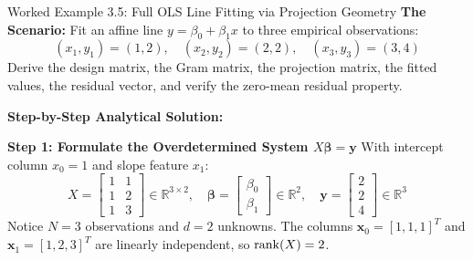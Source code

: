 \begin{examplebox}{Worked Example 3.5: Full OLS Line Fitting via Projection Geometry}
\label{ex:w03_ols_line_fitting}
\textbf{The Scenario:}
Fit an affine line $y = \beta_0 + \beta_1 x$ to three empirical observations:
\begin{equation*}
(x_1, y_1) = (1, 2), \quad (x_2, y_2) = (2, 2), \quad (x_3, y_3) = (3, 4)
\end{equation*}
Derive the design matrix, the Gram matrix, the projection matrix, the fitted values, the residual vector, and verify the zero-mean residual property.

\tcblower
\textbf{Step-by-Step Analytical Solution:}

\textbf{Step 1: Formulate the Overdetermined System $X\boldsymbol{\beta} = \mathbf{y}$}
With intercept column $x_0 = 1$ and slope feature $x_1$:
\begin{equation*}
X = \begin{bmatrix} 1 & 1 \\ 1 & 2 \\ 1 & 3 \end{bmatrix} \in \mathbb{R}^{3 \times 2}, \quad \boldsymbol{\beta} = \begin{bmatrix} \beta_0 \\ \beta_1 \end{bmatrix} \in \mathbb{R}^2, \quad \mathbf{y} = \begin{bmatrix} 2 \\ 2 \\ 4 \end{bmatrix} \in \mathbb{R}^3
\end{equation*}
Notice $N = 3$ observations and $d = 2$ unknowns. The columns $\mathbf{x}_0 = [1, 1, 1]^T$ and $\mathbf{x}_1 = [1, 2, 3]^T$ are linearly independent, so $\operatorname{rank}(X) = 2$.


\end{examplebox}
